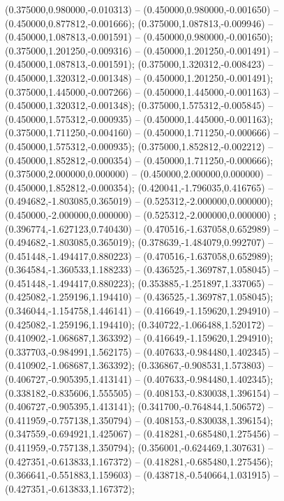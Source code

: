  (0.375000,0.980000,-0.010313) -- (0.450000,0.980000,-0.001650) -- (0.450000,0.877812,-0.001666);
 (0.375000,1.087813,-0.009946) -- (0.450000,1.087813,-0.001591) -- (0.450000,0.980000,-0.001650);
 (0.375000,1.201250,-0.009316) -- (0.450000,1.201250,-0.001491) -- (0.450000,1.087813,-0.001591);
 (0.375000,1.320312,-0.008423) -- (0.450000,1.320312,-0.001348) -- (0.450000,1.201250,-0.001491);
 (0.375000,1.445000,-0.007266) -- (0.450000,1.445000,-0.001163) -- (0.450000,1.320312,-0.001348);
 (0.375000,1.575312,-0.005845) -- (0.450000,1.575312,-0.000935) -- (0.450000,1.445000,-0.001163);
 (0.375000,1.711250,-0.004160) -- (0.450000,1.711250,-0.000666) -- (0.450000,1.575312,-0.000935);
 (0.375000,1.852812,-0.002212) -- (0.450000,1.852812,-0.000354) -- (0.450000,1.711250,-0.000666);
 (0.375000,2.000000,0.000000) -- (0.450000,2.000000,0.000000) -- (0.450000,1.852812,-0.000354);
 (0.420041,-1.796035,0.416765) -- (0.494682,-1.803085,0.365019) -- (0.525312,-2.000000,0.000000);
 (0.450000,-2.000000,0.000000) -- (0.525312,-2.000000,0.000000) ;
 (0.396774,-1.627123,0.740430) -- (0.470516,-1.637058,0.652989) -- (0.494682,-1.803085,0.365019);
 (0.378639,-1.484079,0.992707) -- (0.451448,-1.494417,0.880223) -- (0.470516,-1.637058,0.652989);
 (0.364584,-1.360533,1.188233) -- (0.436525,-1.369787,1.058045) -- (0.451448,-1.494417,0.880223);
 (0.353885,-1.251897,1.337065) -- (0.425082,-1.259196,1.194410) -- (0.436525,-1.369787,1.058045);
 (0.346044,-1.154758,1.446141) -- (0.416649,-1.159620,1.294910) -- (0.425082,-1.259196,1.194410);
 (0.340722,-1.066488,1.520172) -- (0.410902,-1.068687,1.363392) -- (0.416649,-1.159620,1.294910);
 (0.337703,-0.984991,1.562175) -- (0.407633,-0.984480,1.402345) -- (0.410902,-1.068687,1.363392);
 (0.336867,-0.908531,1.573803) -- (0.406727,-0.905395,1.413141) -- (0.407633,-0.984480,1.402345);
 (0.338182,-0.835606,1.555505) -- (0.408153,-0.830038,1.396154) -- (0.406727,-0.905395,1.413141);
 (0.341700,-0.764844,1.506572) -- (0.411959,-0.757138,1.350794) -- (0.408153,-0.830038,1.396154);
 (0.347559,-0.694921,1.425067) -- (0.418281,-0.685480,1.275456) -- (0.411959,-0.757138,1.350794);
 (0.356001,-0.624469,1.307631) -- (0.427351,-0.613833,1.167372) -- (0.418281,-0.685480,1.275456);
 (0.366641,-0.551883,1.159603) -- (0.438718,-0.540664,1.031915) -- (0.427351,-0.613833,1.167372);
